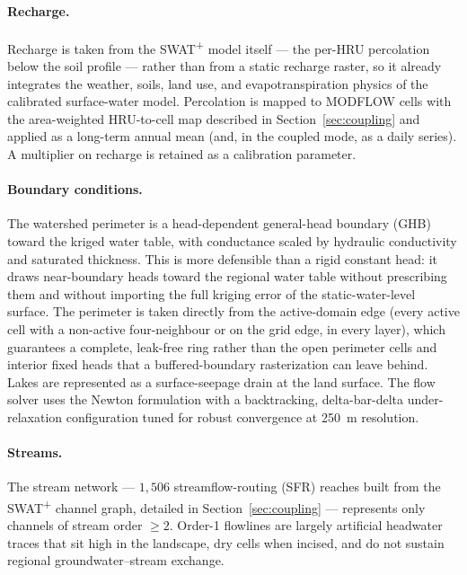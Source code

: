 \paragraph{Recharge.} Recharge is taken from the SWAT\textsuperscript{+} model itself --- the
per-HRU percolation below the soil profile --- rather than from a static recharge raster, so it
already integrates the weather, soils, land use, and evapotranspiration physics of the calibrated
surface-water model. Percolation is mapped to MODFLOW cells with the area-weighted HRU-to-cell map
described in Section~\ref{sec:coupling} and applied as a long-term annual mean (and, in the coupled
mode, as a daily series). A multiplier on recharge is retained as a calibration parameter.

\paragraph{Boundary conditions.} The watershed perimeter is a head-dependent general-head boundary
(GHB) toward the kriged water table, with conductance scaled by hydraulic conductivity and saturated
thickness. This is more defensible than a rigid constant head: it draws near-boundary heads toward
the regional water table without prescribing them and without importing the full kriging error of
the static-water-level surface. The perimeter is taken directly from the active-domain edge (every
active cell with a non-active four-neighbour or on the grid edge, in every layer), which guarantees
a complete, leak-free ring rather than the open perimeter cells and interior fixed heads that a
buffered-boundary rasterization can leave behind. Lakes are represented as a surface-seepage drain
at the land surface. The flow solver uses the Newton formulation with a backtracking,
delta-bar-delta under-relaxation configuration tuned for robust convergence at 250~m resolution.

\paragraph{Streams.} The stream network --- $1{,}506$ streamflow-routing (SFR) reaches built from
the SWAT\textsuperscript{+} channel graph, detailed in Section~\ref{sec:coupling} --- represents
only channels of stream order $\geq 2$. Order-1 flowlines are largely artificial headwater traces
that sit high in the landscape, dry cells when incised, and do not sustain regional
groundwater--stream exchange.
